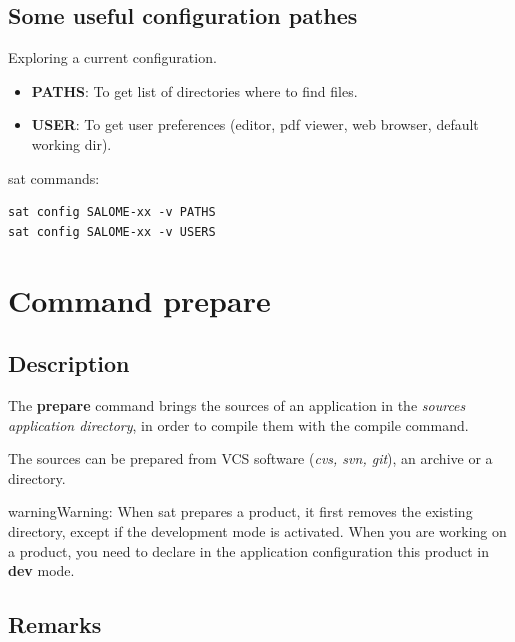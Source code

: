 \documentclass[a4paper,10pt,english]{sphinxmanual}
\begin{document}
\subsection{Some useful configuration pathes}
\label{commands/config:some-useful-configuration-pathes}
Exploring a current configuration.
\begin{itemize}
\item {} 
\textbf{PATHS}: To get list of directories where to find files.

\item {} 
\textbf{USER}: To get user preferences (editor, pdf viewer, web browser, default working dir).

\end{itemize}

sat commands:

\begin{Verbatim}[commandchars=\\\{\}]
sat config SALOME-xx -v PATHS
sat config SALOME-xx -v USERS
\end{Verbatim}
\clearpage

\section{Command prepare}
\label{commands/prepare:svn}\label{commands/prepare:command-prepare}\label{commands/prepare::doc}

\subsection{Description}
\label{commands/prepare:description}
The \textbf{prepare} command brings the sources of an application in the \emph{sources
application directory}, in order to compile them with the compile command.

The sources can be prepared from VCS software (\emph{cvs, svn, git}), an archive or a directory.

\begin{notice}{warning}{Warning:}
When sat prepares a product, it first removes the
existing directory, except if the development mode is activated.
When you are working on a product, you need to declare in
the application configuration this product in \textbf{dev} mode.
\end{notice}


\subsection{Remarks}
\label{commands/prepare:remarks}
\end{document}
